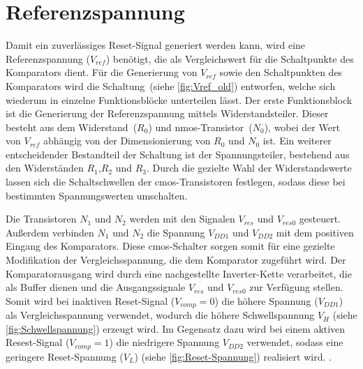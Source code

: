 \section{Referenzspannung}
Damit ein zuverlässiges Reset-Signal generiert werden kann, wird eine Referenzspannung ($V_{ref}$) benötigt, die als Vergleichswert für die Schaltpunkte des Komparators dient. Für die Generierung von $V_{ref}$ sowie den Schaltpunkten des Komparators wird die Schaltung~(siehe \autoref{fig:Vref_old}) entworfen, welche sich wiederum in einzelne Funktionsblöcke unterteilen lässt. Der erste Funktionsblock ist die Generierung der Referenzspannung mittels Widerstandsteiler. Dieser besteht aus dem Widerstand~($R_0$) und \gls{nmos}-Transistor~($N_0$), wobei der Wert von $V_{ref}$ abhängig von der Dimensionierung von $R_0$ und $N_0$ ist. Ein weiterer entscheidender Bestandteil der Schaltung ist der Spannungsteiler, bestehend aus den Widerständen $R_1$,$R_2$ und $R_3$. Durch die gezielte Wahl der Widerstandswerte lassen sich die Schaltschwellen der \gls{cmos}-Transistoren festlegen, sodass diese bei bestimmten Spannungswerten umschalten. 

Die Transistoren $N_1$ und $N_2$ werden mit den Signalen $V_{res}$ und $V_{res0}$ gesteuert. Außerdem verbinden $N_1$ und $N_2$ die Spannung $V_{DD1}$ und $V_{DD2}$ mit dem positiven Eingang des Komparators. Diese \gls{cmos}-Schalter sorgen somit für eine gezielte Modifikation der Vergleichsspannung, die dem Komparator zugeführt wird. Der Komparatorausgang wird durch eine nachgestellte Inverter-Kette verarbeitet, die als Buffer dienen und die Ausgangssignale $V_{res}$ und $V_{res0}$ zur Verfügung stellen. Somit wird bei inaktiven Reset-Signal ($V_{comp} = 0$) die höhere Spannung ($V_{DD1}$) als Vergleichsspannung verwendet, wodurch die höhere Schwellspannung $V_H$ (siehe \autoref{fig:Schwellspannung}) erzeugt wird. Im Gegensatz dazu wird bei einem aktiven Resest-Signal ($V_{comp} = 1$) die niedrigere Spannung $V_{DD2}$ verwendet, sodass eine geringere Reset-Spannung ($V_L$) (siehe \autoref{fig:Reset-Spannung}) realisiert wird.
\cite{DesignOfAnalogCMOSIntegratedCircuits}\cite{MicroelectronicCircuits}.

